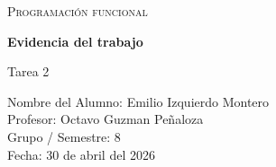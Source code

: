\documentclass[12pt]{article}
\begin{document}
\begin{titlepage}
    \centering


    {\scshape\Large Programación funcional \par}
    \vspace{1.5cm}

    {\huge\bfseries Evidencia del trabajo \par}
    \vspace{0.5cm}
    {\Large Tarea 2 \par}

    \vfill

    {\large
    Nombre del Alumno: Emilio Izquierdo Montero {\hspace{6cm}} \\
    \vspace{0.3cm}
    Profesor: Octavo Guzman Peñaloza {\hspace{6cm}} \\
    \vspace{0.3cm}
    Grupo / Semestre: 8 {\hspace{6cm}} \\
    \vspace{0.3cm}
    Fecha: 30 de abril del 2026 {\hspace{6cm}}
    \par}

    \vfill

\end{titlepage}
\end{document}
